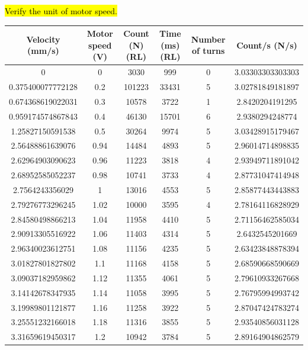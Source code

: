 \documentclass[a4paper]{report}
\numberwithin{equation}{section}
\begin{document}
\hl{Verify the unit of motor speed.}
\begin{table}[!ht]
    \centering
    \begin{tabular}{|c|c|c|c|c|c|}
    \hline
        Velocity (mm/s) & Motor speed (V) & Count (N) (RL) & Time (ms) (RL) & Number of turns & Count/s (N/s) \\ \hline
        0 & 0 & 3030 & 999 & 0 & 3.03303303303303 \\ \hline
        0.375400077772128 & 0.2 & 101223 & 33431 & 5 & 3.02781849181897 \\ \hline
        0.674368619022031 & 0.3 & 10578 & 3722 & 1 & 2.8420204191295 \\ \hline
        0.959174574867843 & 0.4 & 46130 & 15701 & 6 & 2.9380294248774 \\ \hline
        1.25827150591538 & 0.5 & 30264 & 9974 & 5 & 3.03428915179467 \\ \hline
        2.56488861639076 & 0.94 & 14484 & 4893 & 5 & 2.96014714898835 \\ \hline
        2.62964903090623 & 0.96 & 11223 & 3818 & 4 & 2.93949711891042 \\ \hline
        2.68952585052237 & 0.98 & 10741 & 3733 & 4 & 2.87731047414948 \\ \hline
        2.7564243356029 & 1 & 13016 & 4553 & 5 & 2.85877443443883 \\ \hline
        2.79276773296245 & 1.02 & 10000 & 3595 & 4 & 2.78164116828929 \\ \hline
        2.84580498866213 & 1.04 & 11958 & 4410 & 5 & 2.71156462585034 \\ \hline
        2.90913305516922 & 1.06 & 11403 & 4314 & 5 & 2.6432545201669 \\ \hline
        2.96340023612751 & 1.08 & 11156 & 4235 & 5 & 2.63423848878394 \\ \hline
        3.01827801827802 & 1.1 & 11168 & 4158 & 5 & 2.68590668590669 \\ \hline
        3.09037182959862 & 1.12 & 11355 & 4061 & 5 & 2.79610933267668 \\ \hline
        3.14142678347935 & 1.14 & 11058 & 3995 & 5 & 2.76795994993742 \\ \hline
        3.19989801121877 & 1.16 & 11258 & 3922 & 5 & 2.87047424783274 \\ \hline
        3.25551232166018 & 1.18 & 11316 & 3855 & 5 & 2.93540856031128 \\ \hline
        3.31659619450317 & 1.2 & 10942 & 3784 & 5 & 2.89164904862579 \\ \hline

\end{tabular}
\end{table}
\end{document}
